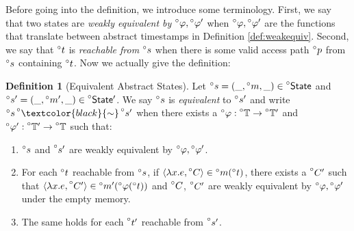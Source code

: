 \documentclass[acmsmall,review]{acmart}\settopmatter{printfolios=true,printccs=false,printacmref=false}
\theoremstyle{definition}
\newtheorem{defn}{Definition}[section]
\theoremstyle{plain}
\newcommand*{\A}[1]{\prescript{\circ}{}{#1}}
\newcommand*{\Time}{\mathbb{T}}
\newcommand*{\ATime}{\A{\Time}}
\newcommand*{\mem}{m}
\newcommand*{\AState}{\A{\mathsf{State}}}
\newcommand*{\equivalent}[1][black]{\textcolor{#1}{\sim}}
\begin{document}
Before going into the definition, we introduce some terminology.
First, we say that two states are \emph{weakly equivalent by} $\A\varphi,\A\varphi'$ when $\A\varphi,\A\varphi'$ are the functions that translate between abstract timestamps in Definition \ref{def:weakequiv}.
Second, we say that $\A{t}$ is \emph{reachable from} $\A{s}$ when there is some valid access path $\A{p}$ from $\A{s}$ containing $\A{t}$.
Now we actually give the definition:
\begin{defn}[Equivalent Abstract States]
  Let $\A{s}=(\_,\A\mem,\_)\in\AState$ and $\A{s}'=(\_,\A\mem',\_)\in\AState'$.
  We say $\A{s}$ is \emph{equivalent} to $\A{s}'$ and write $\A{s}\A\equivalent\A{s'}$ when there exists a $\A\varphi:\ATime\rightarrow\ATime'$ and $\A\varphi':\ATime'\rightarrow\ATime$ such that:
  \begin{enumerate}
    \item $\A{s}$ and $\A{s'}$ are weakly equivalent by $\A\varphi,\A\varphi'$.
    \item For each $\A{t}$ reachable from $\A{s}$, if $\langle\lambda x.e,\A{C}\rangle\in\A\mem(\A{t})$, there exists a $\A{C'}$ such that $\langle\lambda x.e,\A{C'}\rangle\in\A\mem'(\A\varphi(\A{t}))$ and $\A{C}$, $\A{C'}$ are weakly equivalent by $\A\varphi,\A\varphi'$ under the empty memory.
    \item The same holds for each $\A{t'}$ reachable from $\A{s'}$.
  \end{enumerate}
\end{defn}
\end{document}
